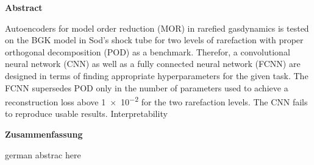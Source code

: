 

%
%
{
\pagestyle{empty}
\begin{center}
{\sffamily \bfseries\Large Abstract}\\
\end{center}%
\vspace{1cm}
%
Autoencoders for model order reduction (MOR) in rarefied gasdynamics is tested on the BGK model in Sod's shock tube for two levels of rarefaction with proper orthogonal decomposition (POD) as a benchmark. Therefor, a convolutional neural network (CNN) as well as a fully connected neural network (FCNN) are designed in terms of finding appropriate hyperparameters for the given task. The FCNN supersedes POD only in the number of parameters used to achieve a reconstruction loss above \num{1e-2} for the two rarefaction levels. The CNN fails to reproduce usable results. Interpretability        
\vspace{1.5cm}

%
\begin{center}
{\sffamily \bfseries\Large Zusammenfassung}\\
\end{center}%
\vspace{1cm}
%
german abstrac here

\newpage
\pagestyle{plain}
}